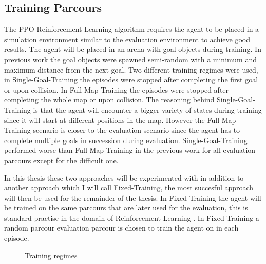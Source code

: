 \subsection*{Training Parcours}
The PPO Reinforcement Learning algorithm requires the agent to be placed in a simulation environment similar to the evaluation environment to achieve good results. The agent will be placed in an arena with goal objects during training. In previous work \autocite{maximilian} the goal objects were spawned semi-random with a minimum and maximum distance from the next goal. Two different training regimes were used, in Single-Goal-Training the episodes were stopped after completing the first goal or upon collision. In Full-Map-Training the episodes were stopped after completing the whole map or upon collision. The reasoning behind Single-Goal-Training is that the agent will encounter a bigger variety of states during training since it will start at different positions in the map. However the Full-Map-Training scenario is closer to the evaluation scenario since the agent has to complete multiple goals in succession during evaluation.
Single-Goal-Training performed worse than Full-Map-Training in the previous work \autocite{maximilian} for all evaluation parcours except for the difficult one.

In this thesis these two approaches will be experimented with in addition to another approach which I will call Fixed-Training, the most succesful approach will then be used for the remainder of the thesis. In Fixed-Training the agent will be trained on the same parcours that are later used for the evaluation, this is standard practise in the domain of Reinforcement Learning \autocite{rlbook2020}. In Fixed-Training a random parcour evaluation parcour is chosen to train the agent on in each episode.

\begin{figure}
     \centering
     \qquad
     \qquad
     \caption{Training regimes} 
     \label{fig:training_regimes}
\end{figure}

